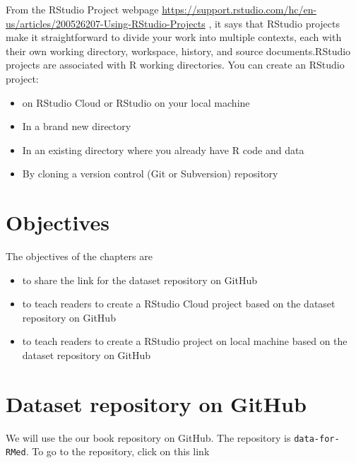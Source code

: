 \documentclass[
  10pt,
]{krantz}
\providecommand{\tightlist}{%
  \setlength{\itemsep}{0pt}\setlength{\parskip}{0pt}}
\begin{document}
From the RStudio Project webpage \url{https://support.rstudio.com/hc/en-us/articles/200526207-Using-RStudio-Projects} , it says that RStudio projects make it straightforward to divide your work into multiple contexts, each with their own working directory, workspace, history, and source documents.RStudio projects are associated with R working directories. You can create an RStudio project:

\begin{itemize}
\tightlist
\item
  on RStudio Cloud or RStudio on your local machine
\item
  In a brand new directory
\item
  In an existing directory where you already have R code and data
\item
  By cloning a version control (Git or Subversion) repository
\end{itemize}

\hypertarget{objectives-2}{%
\section{Objectives}\label{objectives-2}}

The objectives of the chapters are

\begin{itemize}
\tightlist
\item
  to share the link for the dataset repository on GitHub
\item
  to teach readers to create a RStudio Cloud project based on the dataset repository on GitHub
\item
  to teach readers to create a RStudio project on local machine based on the dataset repository on GitHub
\end{itemize}

\hypertarget{dataset-repository-on-github}{%
\section{\texorpdfstring{Dataset repository on GitHub}{Dataset repository on GitHub}}\label{dataset-repository-on-github}}

We will use the our book repository on GitHub. The repository is \texttt{data-for-RMed}. To go to the repository, click on this link
\end{document}
